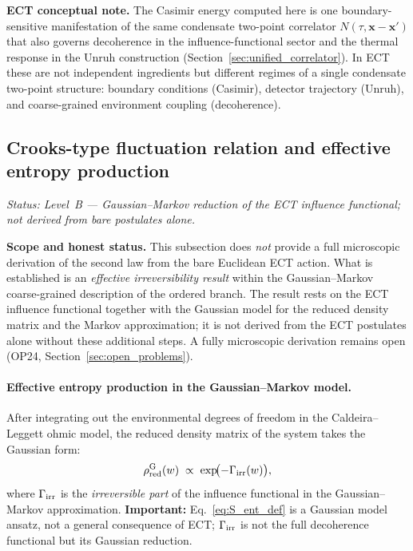 \documentclass[11pt,a4paper]{article}
\numberwithin{equation}{section}
\begin{document}
\textbf{ECT conceptual note.}
The Casimir energy computed here is one boundary-sensitive manifestation
of the same condensate two-point correlator $N(\tau,\mathbf{x}-\mathbf{x}')$
that also governs decoherence in the influence-functional sector and
the thermal response in the Unruh construction
(Section~\ref{sec:unified_correlator}).  In ECT these are not
independent ingredients but different regimes of a single condensate
two-point structure: boundary conditions (Casimir), detector trajectory
(Unruh), and coarse-grained environment coupling (decoherence).


\subsection{Crooks-type fluctuation relation and effective entropy production}
\label{sec:crooks_ect}

\textit{Status: Level~B --- Gaussian--Markov reduction of the ECT
influence functional; not derived from bare postulates alone.}



\textbf{Scope and honest status.}
This subsection does \emph{not} provide a full microscopic derivation
of the second law from the bare Euclidean ECT action.  What is
established is an \emph{effective irreversibility result} within the
Gaussian--Markov coarse-grained description of the ordered branch.
The result rests on the ECT influence functional together with the
Gaussian model for the reduced density matrix and the Markov
approximation; it is not derived from the ECT postulates alone
without these additional steps.  A fully microscopic derivation
remains open (OP24, Section~\ref{sec:open_problems}).

\paragraph{Effective entropy production in the Gaussian--Markov model.}

After integrating out the environmental degrees of freedom in the
Caldeira--Leggett ohmic model, the reduced density matrix of the
system takes the Gaussian form:
\begin{equation}
\label{eq:S_ent_def}
\rho_{\rm red}^{\rm G}(w) \;\propto\;
  \exp\!\bigl(-\Gamma_{\rm irr}(w)\bigr),
\end{equation}
where $\Gamma_{\rm irr}$ is the \emph{irreversible part} of the
influence functional in the Gaussian--Markov approximation.
\textbf{Important:} Eq.~\eqref{eq:S_ent_def} is a Gaussian model
ansatz, not a general consequence of ECT; $\Gamma_{\rm irr}$ is
not the full decoherence functional but its Gaussian reduction.
\end{document}
